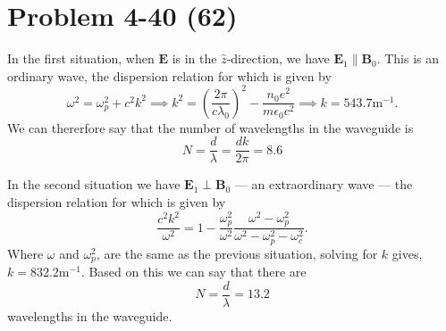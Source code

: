 \section*{Problem 4-40 (62)}
\label{sec:4-40}
In the first situation, when \(\bm{E} \) is in the \(\hat{z}\)-direction, we have \(\bm{E}_1\parallel\bm{B}_0 \). This is an ordinary wave, the dispersion relation for which is given by
\begin{equation*}
	\omega^2 = \omega^2_p + c^2k^2 \implies k^2 = \left(\dfrac{2\pi}{c\lambda_0} \right)^2 - \dfrac{n_0e^2}{m\epsilon_0c^2} \implies k = 543.7\text{m}^{-1}.
\end{equation*}
We can thererfore say that the number of wavelengths in the waveguide is
\begin{equation*}
	N = \dfrac{d}{\lambda} = \dfrac{dk}{2\pi} = 8.6
\end{equation*}

In the second situation we have \(\bm{E}_1\perp\bm{B}_0 \) --- an extraordinary wave --- the dispersion relation for which is given by
\begin{equation*}
	\dfrac{c^2k^2}{\omega^2} = 1 - \dfrac{\omega^2_p}{\omega^2}\dfrac{\omega^2 - \omega^2_p}{\omega^2 - \omega^2_p - \omega^2_c}.
\end{equation*}
Where \(\omega\) and \(\omega_p^2 \), are the same as the previous situation, solving for \(k\) gives, \(k = 832.2\text{m}^{-1} \). Based on this we can say that there are
\begin{equation*}
	N =\dfrac{d}{\lambda} = 13.2
\end{equation*}
wavelengths in the waveguide.

